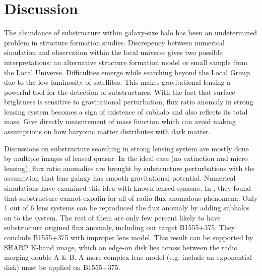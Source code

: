 \documentclass[useAMS,usenatbib]{mn2e}
\begin{document}
\section{Discussion}
The abundance of substructure within galaxy-size halo has been an undetermined problem in structure formation studies. Discrepency between numerical simulation and observation within the local universe gives two possible interpretations: an alternative structure formation model or small sample from the Local Universe. Difficulties emerge while searching beyond the Local Group due to the low luminosity of satellites. This makes gravitational lensing a powerful tool for the detection of substructures. With the fact that surface brightness is sensitive to gravitational perturbation, flux ratio anomaly in strong lensing system becomes a sign of existence of subhalo and also reflects its total mass. Give directly measurement of mass function which can avoid making assumptions on how baryonic matter distributes with dark matter.

Discussions on substructure searching in strong lensing system are mostly done by multiple images of lensed quasar. In the ideal case (no extinction and micro lensing), flux ratio anomalies are brought by substructure perturbations with the assumption that lens galaxy has smooth gravitational potential. Numerical simulations have examined this idea with known lensed quasars. In \citet{Xu14}, they found that substructure cannot expalin for all of radio flux anomalous phenomena. Only 1 out of 6 lens systems can be reproduced the flux anomaly by adding subhalos on to the system. The rest of them are only few percent likely to have substructure origined flux anomaly, including our target B1555+375. They conclude B1555+375 with improper lens model. This result can be supported by SHARP K-band image, which an edge-on disk lies across between the radio merging double A \& B. A more complex lens model (e.g. include an exponential disk) must be applied on B1555+375.
\end{document}
